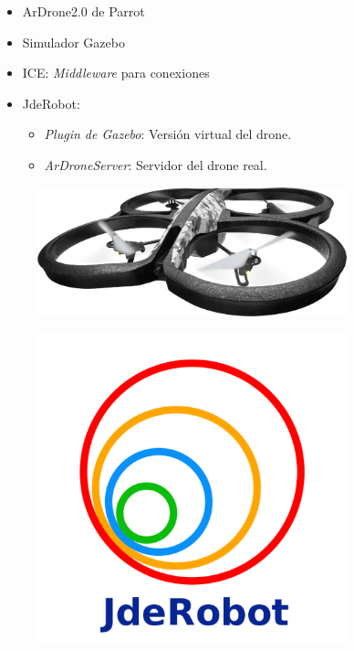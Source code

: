 \documentclass[notes,slidesec,a4]{seminar}
\begin{document}
\begin{hslide}
\begin{minipage}[t]{0.7\textwidth}
\begin{itemize}
\item ArDrone2.0 de Parrot
\item Simulador Gazebo
\item ICE: \emph{Middleware} para conexiones
\item JdeRobot:
\begin{itemize}
\item \emph{Plugin de Gazebo}: Versión virtual del drone.
\item \emph{ArDroneServer}: Servidor del drone real.
\end{itemize}
\end{itemize}
\end{minipage}
\begin{minipage}[t]{0.3\textwidth}
\begin{center}
\begin{figure}
\includegraphics[width=0.8\textwidth]{img/ardrone}
\end{figure}
\end{center}
\begin{center}
\begin{figure}
\includegraphics[width=0.8\textwidth]{img/jderobot}
\end{figure}
\end{center}
\end{minipage}
\end{hslide}
\end{document}
